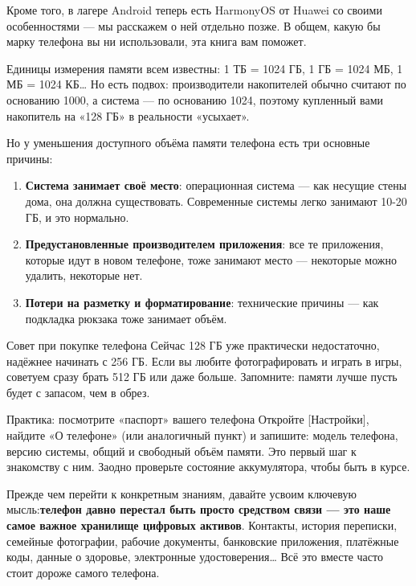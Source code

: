 Кроме того, в лагере Android теперь есть HarmonyOS от Huawei со своими особенностями — мы расскажем о ней отдельно позже. В общем, какую бы марку телефона вы ни использовали, эта книга вам поможет.


Единицы измерения памяти всем известны: 1 ТБ = 1024 ГБ, 1 ГБ = 1024 МБ, 1 МБ = 1024 КБ… Но есть подвох: производители накопителей обычно считают по основанию 1000, а система — по основанию 1024, поэтому купленный вами накопитель на «128 ГБ» в реальности «усыхает».

Но у уменьшения доступного объёма памяти телефона есть три основные причины:

\begin{enumerate}
  \item \textbf{Система занимает своё место}: операционная система — как несущие стены дома, она должна существовать. Современные системы легко занимают 10-20 ГБ, и это нормально.
  \item \textbf{Предустановленные производителем приложения}: все те приложения, которые идут в новом телефоне, тоже занимают место — некоторые можно удалить, некоторые нет.
  \item \textbf{Потери на разметку и форматирование}: технические причины — как подкладка рюкзака тоже занимает объём.
\end{enumerate}

\begin{tcbinfo}{Совет при покупке телефона}
Сейчас 128 ГБ уже практически недостаточно, надёжнее начинать с 256 ГБ. Если вы любите фотографировать и играть в игры, советуем сразу брать 512 ГБ или даже больше. Запомните: памяти лучше пусть будет с запасом, чем в обрез.

\end{tcbinfo}

\begin{tcbpractice}{Практика: посмотрите «паспорт» вашего телефона}
Откройте [Настройки], найдите «О телефоне» (или аналогичный пункт) и запишите: модель телефона, версию системы, общий и свободный объём памяти. Это первый шаг к знакомству с ним. Заодно проверьте состояние аккумулятора, чтобы быть в курсе.

\end{tcbpractice}


Прежде чем перейти к конкретным знаниям, давайте усвоим ключевую мысль:\textbf{телефон давно перестал быть просто средством связи — это наше самое важное хранилище цифровых активов}. Контакты, история переписки, семейные фотографии, рабочие документы, банковские приложения, платёжные коды, данные о здоровье, электронные удостоверения… Всё это вместе часто стоит дороже самого телефона.

